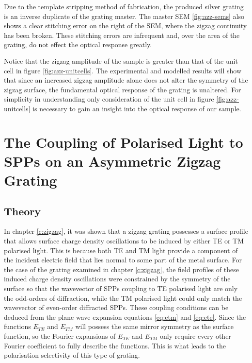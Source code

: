 Due to the template stripping method of fabrication, the produced silver grating is an inverse duplicate of the grating master. The master SEM \ref{fig:azz-sems} also shows a clear stitching error on the right of the SEM, where the zigzag continuity has been broken. These stitching errors are infrequent and, over the area of the grating, do not effect the optical response greatly.

Notice that the zigzag amplitude of the sample is greater than that of the unit cell in figure \ref{fig:azz-unitcells}. The experimental and modelled results will show that since an increased zigzag amplitude alone does not alter the symmetry of the zigzag surface, the fundamental optical response of the grating is unaltered. For simplicity in understanding only consideration of the unit cell in figure \ref{fig:azz-unitcells} is necessary to gain an insight into the optical response of our sample.

\section{The Coupling of Polarised Light to SPPs on an Asymmetric Zigzag Grating\label{sec:asym-lightcoupling}}
\subsection{Theory}

In chapter \ref{c:zigzag}, it was shown that a zigzag grating possesses a surface profile that allows surface charge density oscillations to be induced by either TE or TM polarised light. This is because both TE and TM light provide a component of the incident electric field that lies normal to some part of the metal surface. For the case of the grating examined in chapter \ref{c:zigzag}, the field profiles of these induced charge density oscillations were constrained by the symmetry of the surface so that the wavevector of SPPs  coupling to TE polarised light are only the odd-orders of diffraction, while the TM polarised light could only match the wavevector of even-order diffracted SPPs. These coupling conditions can be deduced from the plane wave expansion equations \ref{eq:etm} and \ref{eq:ete}. Since the functions $E_{TE}$ and $E_{TM}$ will possess the same mirror symmetry as the surface function,  so the Fourier expansions of  $E_{TE}$ and $E_{TM}$ only require every-other Fourier coefficient to fully describe the functions. This is what leads to the polarisation selectivity of this type of grating.

